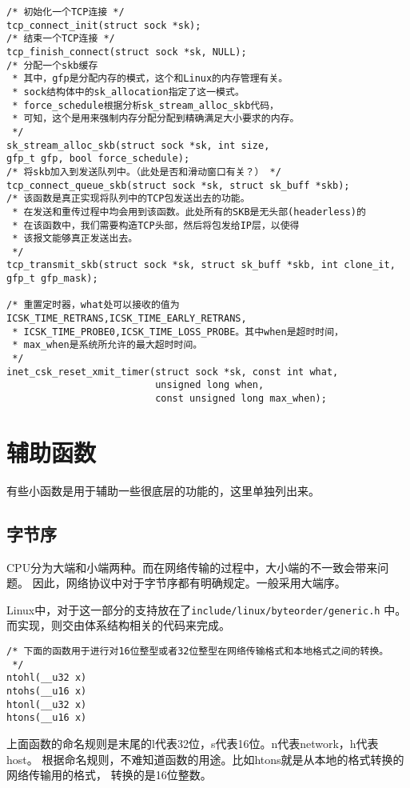 \documentclass[11pt, a4paper,oneside]{book}
\theoremstyle{ocrenumbox}
\theoremstyle{purplenumbox}
\theoremstyle{blackbox}
\begin{document}
\begin{verbatim}
/* 初始化一个TCP连接 */
tcp_connect_init(struct sock *sk);
/* 结束一个TCP连接 */
tcp_finish_connect(struct sock *sk, NULL);
/* 分配一个skb缓存
 * 其中，gfp是分配内存的模式，这个和Linux的内存管理有关。
 * sock结构体中的sk_allocation指定了这一模式。
 * force_schedule根据分析sk_stream_alloc_skb代码，
 * 可知，这个是用来强制内存分配分配到精确满足大小要求的内存。
 */
sk_stream_alloc_skb(struct sock *sk, int size,
gfp_t gfp, bool force_schedule);
/* 将skb加入到发送队列中。（此处是否和滑动窗口有关？） */ 
tcp_connect_queue_skb(struct sock *sk, struct sk_buff *skb);
/* 该函数是真正实现将队列中的TCP包发送出去的功能。
 * 在发送和重传过程中均会用到该函数。此处所有的SKB是无头部(headerless)的
 * 在该函数中，我们需要构造TCP头部，然后将包发给IP层，以使得
 * 该报文能够真正发送出去。
 */
tcp_transmit_skb(struct sock *sk, struct sk_buff *skb, int clone_it,
gfp_t gfp_mask);

/* 重置定时器，what处可以接收的值为ICSK_TIME_RETRANS,ICSK_TIME_EARLY_RETRANS,
 * ICSK_TIME_PROBE0,ICSK_TIME_LOSS_PROBE。其中when是超时时间，
 * max_when是系统所允许的最大超时时间。
 */
inet_csk_reset_xmit_timer(struct sock *sk, const int what,
                          unsigned long when,
                          const unsigned long max_when);
\end{verbatim}

\section{辅助函数}
有些小函数是用于辅助一些很底层的功能的，这里单独列出来。

\subsection{字节序}
CPU分为大端和小端两种。而在网络传输的过程中，大小端的不一致会带来问题。
因此，网络协议中对于字节序都有明确规定。一般采用大端序。

Linux中，对于这一部分的支持放在了\texttt{include/linux/byteorder/generic.h}
中。而实现，则交由体系结构相关的代码来完成。

\begin{verbatim}
/* 下面的函数用于进行对16位整型或者32位整型在网络传输格式和本地格式之间的转换。
 */
ntohl(__u32 x)
ntohs(__u16 x)
htonl(__u32 x)
htons(__u16 x)
\end{verbatim}

上面函数的命名规则是末尾的l代表32位，s代表16位。n代表network，h代表host。
根据命名规则，不难知道函数的用途。比如htons就是从本地的格式转换的网络传输用的格式，
转换的是16位整数。
\end{document}
